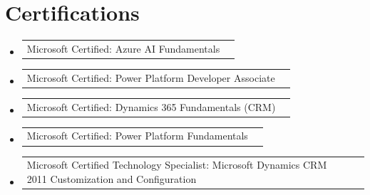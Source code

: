 \documentclass[a4paper,11pt]{article}
\makeatletter
\newcommand{\resumeCertification}[2]{%
  \item
  \begin{tabular*}{0.97\textwidth}{@{}l@{\extracolsep{\fill}}r@{}}
    #1 & \text{#2} \\
  \end{tabular*}\vspace{-4pt}
}
\newcommand{\resumeSubHeadingListStart}{\begin{itemize}[leftmargin=0em, itemindent=0em, label={}, itemsep=0ex]}
\newcommand{\resumeSubHeadingListEnd}{\end{itemize}}
\makeatother
\begin{document}
\section{Certifications}
\resumeSubHeadingListStart
\resumeCertification{Microsoft Certified: Azure AI Fundamentals}{2024}{}{}
\resumeCertification{Microsoft Certified: Power Platform Developer Associate}{2024}{}{}
\resumeCertification{Microsoft Certified: Dynamics 365 Fundamentals (CRM)}{2023}{}{}
\resumeCertification{Microsoft Certified: Power Platform Fundamentals}{2023}{}{}
\resumeCertification{Microsoft Certified Technology Specialist: Microsoft Dynamics CRM 2011 Customization and Configuration}{2013}{}{}
\resumeSubHeadingListEnd
\end{document}
